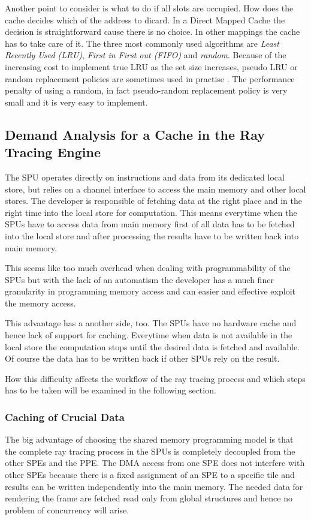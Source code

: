 \documentclass[DIV10, abstracton, openright, footsepline, headsepline, twoside, 9pt,
bigheadings]{scrreprt}
\begin{document}
Another point to consider is what to do if all slots are occupied. How
does the cache decides which of the address to dicard. In a Direct Mapped Cache
the decision is straightforward cause there is no choice. In other mappings the
cache has to take care of it.
The three most commonly used algorithms are \textit{Least Recently Used (LRU)},
\textit{First in First out (FIFO)} and \textit{random}. Because of the increasing
cost to implement true LRU as the set size increases, pseudo LRU or random
replacement policies are sometimes used in practise \cite{Hennesy96}. The
performance penalty of using a random, in fact pseudo-random replacement policy
is very small and it is very easy to implement.

\subsection{Demand Analysis for a Cache in the Ray Tracing Engine}
\label{sec:demand_analysis}

The SPU operates directly on instructions and data from its dedicated local
store, but relies on a channel interface to access the main memory and other
local stores. The developer is responsible of fetching data at the right place
and in the right time into the local store for computation. This means
everytime when the SPUs have to access data from main memory first of all data
has to be fetched into the local store and after processing the results have to
be written back into main memory.

This seems like too much overhead when dealing with programmability of the SPUs
but with the lack of an automatism the developer has a much finer granularity
in programming memory access and can easier and effective exploit the memory
access.

This advantage has a another side, too. The SPUs have no hardware cache and
hence lack of support for caching. Everytime when data is not available in the
local store the computation stops until the desired data is fetched and
available. Of course the data has to be written back if other SPUs rely on the
result.

How this difficulty affects the workflow of the ray tracing process and
which steps has to be taken will be examined in the following section.

\subsubsection*{Caching of Crucial Data}
The big advantage of choosing the shared memory programming model is that the
complete ray tracing process in the SPUs is completely decoupled from the other
SPEs and the PPE. The DMA access from one SPE does not interfere with other SPEs
because there is a fixed assignment of an SPE to a specific tile and results can be
written independently into the main memory. The needed data for rendering the
frame are fetched read only from global structures and hence no problem of
concurrency will arise.
\end{document}

